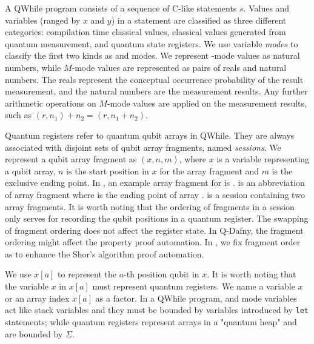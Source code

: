 A QWhile program consists of a sequence of C-like statements $s$.
Values and variables (ranged by $x$ and $y$) in a statement
are classified as three different categories: compilation time classical values, 
classical values generated from quantum measurement, and quantum state registers.
We use variable \textit{modes} to classify the first two kinds as \cmode and \mmode modes.
We represent \cmode-mode values as natural numbers, while $M$-mode values are represented as pairs of reals and natural numbers.
The reals represent the conceptual occurrence probability of the result measurement,
and the natural numbers are the measurement results.
Any further arithmetic operations on $M$-mode values are applied on the measurement results,
such as $(r,n_1)+n_2=(r,n_1+n_2)$.

Quantum registers refer to quantum qubit arrays in QWhile.
They are always associated with disjoint sets of qubit array fragments, named \textit{sessions}.
We represent a qubit array fragment as $(x,n,m)$, where $x$ is a variable representing a qubit array, $n$ is the start position in $x$ for the array fragment and $m$ is the exclusive ending point.
In , an example array fragment for  is .
 is an abbreviation of array fragment  where  is the ending point of array .
 is a session containing two array fragments.
It is worth noting that the ordering of fragments in a session only 
serves for recording the qubit positions in a quantum register.
The swapping of fragment ordering does not affect the register state.
In Q-Dafny, the fragment ordering might affect the property proof automation.
In , we fix fragment order as 
to enhance the Shor's algorithm proof automation. 

We use $x[a]$ to represent the $a$-th position qubit in $x$.
It is worth noting that the variable $x$ in $x[a]$ must represent quantum registers. 
We name a variable $x$ or an array index $x[a]$ as a factor.
In a QWhile program, \cmode and \mmode mode variables act like stack variables
and they must be bounded by variables introduced by \texttt{let} statements;
while quantum registers represent arrays in a "quantum heap" and are bounded by $\Sigma$.

